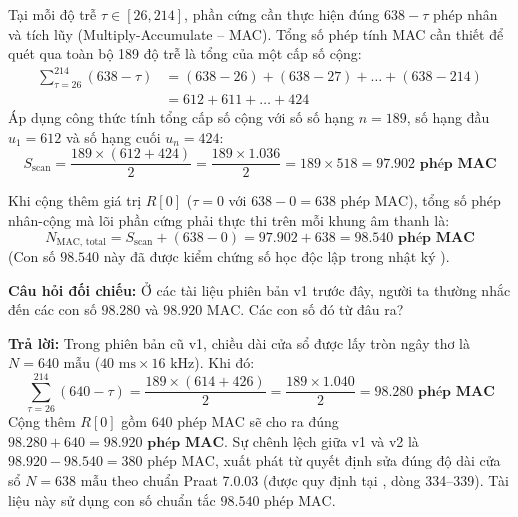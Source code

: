 Tại mỗi độ trễ $\tau \in [26, 214]$, phần cứng cần thực hiện đúng $638 - \tau$ phép nhân và tích lũy (Multiply-Accumulate -- MAC). Tổng số phép tính MAC cần thiết để quét qua toàn bộ 189 độ trễ là tổng của một cấp số cộng:
\begin{align}
\sum_{\tau=26}^{214} (638 - \tau) &= (638 - 26) + (638 - 27) + \dots + (638 - 214) \nonumber \\
&= 612 + 611 + \dots + 424
\end{align}
Áp dụng công thức tính tổng cấp số cộng với số số hạng $n = 189$, số hạng đầu $u_1 = 612$ và số hạng cuối $u_n = 424$:
\begin{equation}
S_{\text{scan}} = \frac{189 \times (612 + 424)}{2} = \frac{189 \times 1.036}{2} = 189 \times 518 = \mathbf{97.902\text{ phép MAC}}
\end{equation}

Khi cộng thêm giá trị $R[0]$ ($\tau = 0$ với $638 - 0 = 638\text{ phép MAC}$), tổng số phép nhân-cộng mà lõi phần cứng phải thực thi trên mỗi khung âm thanh là:
\begin{equation}
N_{\text{MAC, total}} = S_{\text{scan}} + (638 - 0) = 97.902 + 638 = \mathbf{98.540\text{ phép MAC}}
\end{equation}
(Con số $98.540$ này đã được kiểm chứng số học độc lập trong nhật ký ).

\begin{thoughtqa}
\textbf{Câu hỏi đối chiếu:} Ở các tài liệu phiên bản v1 trước đây, người ta thường nhắc đến các con số $98.280$ và $98.920\text{ MAC}$. Các con số đó từ đâu ra?
\par\noindent\textbf{Trả lời:} Trong phiên bản cũ v1, chiều dài cửa sổ được lấy tròn ngây thơ là $N = 640\text{ mẫu}$ ($40\text{ ms} \times 16\text{ kHz}$). Khi đó:
\begin{equation}
\sum_{\tau=26}^{214} (640 - \tau) = \frac{189 \times (614 + 426)}{2} = \frac{189 \times 1.040}{2} = \mathbf{98.280\text{ phép MAC}}
\end{equation}
Cộng thêm $R[0]$ gồm $640\text{ phép MAC}$ sẽ cho ra đúng $98.280 + 640 = \mathbf{98.920\text{ phép MAC}}$. Sự chênh lệch giữa v1 và v2 là $98.920 - 98.540 = 380\text{ phép MAC}$, xuất phát từ quyết định sửa đúng độ dài cửa sổ $N = 638\text{ mẫu}$ theo chuẩn Praat 7.0.03 (được quy định tại , dòng 334--339). Tài liệu này sử dụng con số chuẩn tắc $98.540\text{ phép MAC}$.
\end{thoughtqa}

